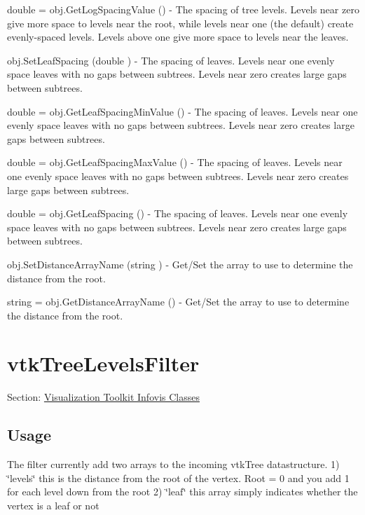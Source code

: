 \begin{DoxyItemize}
\item {\ttfamily double = obj.\-Get\-Log\-Spacing\-Value ()} -\/ The spacing of tree levels. Levels near zero give more space to levels near the root, while levels near one (the default) create evenly-\/spaced levels. Levels above one give more space to levels near the leaves.  
\item {\ttfamily obj.\-Set\-Leaf\-Spacing (double )} -\/ The spacing of leaves. Levels near one evenly space leaves with no gaps between subtrees. Levels near zero creates large gaps between subtrees.  
\item {\ttfamily double = obj.\-Get\-Leaf\-Spacing\-Min\-Value ()} -\/ The spacing of leaves. Levels near one evenly space leaves with no gaps between subtrees. Levels near zero creates large gaps between subtrees.  
\item {\ttfamily double = obj.\-Get\-Leaf\-Spacing\-Max\-Value ()} -\/ The spacing of leaves. Levels near one evenly space leaves with no gaps between subtrees. Levels near zero creates large gaps between subtrees.  
\item {\ttfamily double = obj.\-Get\-Leaf\-Spacing ()} -\/ The spacing of leaves. Levels near one evenly space leaves with no gaps between subtrees. Levels near zero creates large gaps between subtrees.  
\item {\ttfamily obj.\-Set\-Distance\-Array\-Name (string )} -\/ Get/\-Set the array to use to determine the distance from the root.  
\item {\ttfamily string = obj.\-Get\-Distance\-Array\-Name ()} -\/ Get/\-Set the array to use to determine the distance from the root.  
\end{DoxyItemize}\hypertarget{vtkinfovis_vtktreelevelsfilter}{}\section{vtk\-Tree\-Levels\-Filter}\label{vtkinfovis_vtktreelevelsfilter}
Section\-: \hyperlink{sec_vtkinfovis}{Visualization Toolkit Infovis Classes} \hypertarget{vtkwidgets_vtkxyplotwidget_Usage}{}\subsection{Usage}\label{vtkwidgets_vtkxyplotwidget_Usage}
The filter currently add two arrays to the incoming vtk\-Tree datastructure. 1) \char`\"{}levels\char`\"{} this is the distance from the root of the vertex. Root = 0 and you add 1 for each level down from the root 2) \char`\"{}leaf\char`\"{} this array simply indicates whether the vertex is a leaf or not

